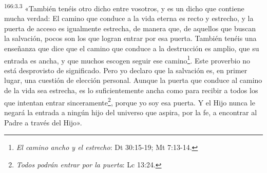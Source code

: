 \par
\textsuperscript{166:3.3} «También tenéis otro dicho entre vosotros, y es un dicho que contiene mucha verdad: El camino que conduce a la vida eterna es recto y estrecho, y la puerta de acceso es igualmente estrecha, de manera que, de aquellos que buscan la salvación, pocos son los que logran entrar por esa puerta. También tenéis una enseñanza que dice que el camino que conduce a la destrucción es amplio, que su entrada es ancha, y que muchos escogen seguir ese camino\footnote{\textit{El camino ancho y el estrecho}: Dt 30:15-19; Mt 7:13-14.}. Este proverbio no está desprovisto de significado. Pero yo declaro que la salvación es, en primer lugar, una cuestión de elección personal. Aunque la puerta que conduce al camino de la vida sea estrecha, es lo suficientemente ancha como para recibir a todos los que intentan entrar sinceramente\footnote{\textit{Todos podrán entrar por la puerta}: Lc 13:24.}, porque yo soy esa puerta. Y el Hijo nunca le negará la entrada a ningún hijo del universo que aspira, por la fe, a encontrar al Padre a través del Hijo».

